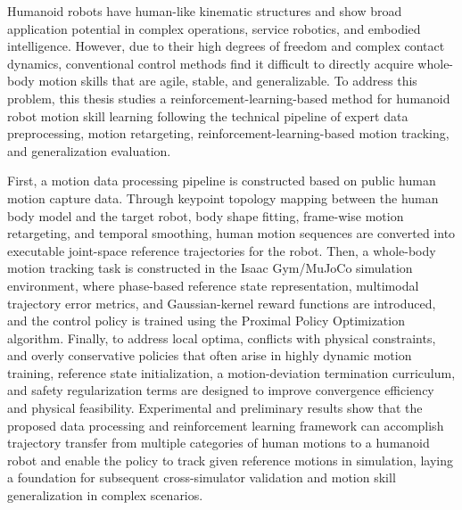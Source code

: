 \begin{eabstract}
Humanoid robots have human-like kinematic structures and show broad application potential in complex operations, service robotics, and embodied intelligence. However, due to their high degrees of freedom and complex contact dynamics, conventional control methods find it difficult to directly acquire whole-body motion skills that are agile, stable, and generalizable. To address this problem, this thesis studies a reinforcement-learning-based method for humanoid robot motion skill learning following the technical pipeline of expert data preprocessing, motion retargeting, reinforcement-learning-based motion tracking, and generalization evaluation.

First, a motion data processing pipeline is constructed based on public human motion capture data. Through keypoint topology mapping between the human body model and the target robot, body shape fitting, frame-wise motion retargeting, and temporal smoothing, human motion sequences are converted into executable joint-space reference trajectories for the robot. Then, a whole-body motion tracking task is constructed in the Isaac Gym/MuJoCo simulation environment, where phase-based reference state representation, multimodal trajectory error metrics, and Gaussian-kernel reward functions are introduced, and the control policy is trained using the Proximal Policy Optimization algorithm. Finally, to address local optima, conflicts with physical constraints, and overly conservative policies that often arise in highly dynamic motion training, reference state initialization, a motion-deviation termination curriculum, and safety regularization terms are designed to improve convergence efficiency and physical feasibility. Experimental and preliminary results show that the proposed data processing and reinforcement learning framework can accomplish trajectory transfer from multiple categories of human motions to a humanoid robot and enable the policy to track given reference motions in simulation, laying a foundation for subsequent cross-simulator validation and motion skill generalization in complex scenarios.
\end{eabstract}
